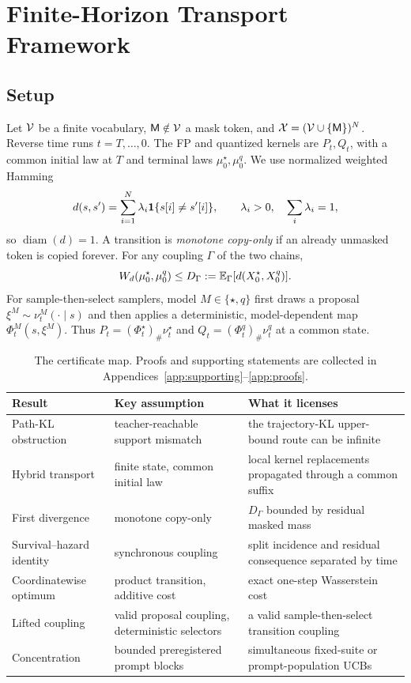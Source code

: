 \section{Finite-Horizon Transport Framework}
\label{sec:framework}

\subsection{Setup}
Let $\mathcal{V}$ be a finite vocabulary, $\mathsf{M}\notin\mathcal{V}$ a mask token, and $\mathcal{X}=(\mathcal{V}\cup\{\mathsf{M}\})^N$. Reverse time runs $t=T,\ldots,0$. The FP and quantized kernels are $P_t,Q_t$, with a common initial law at $T$ and terminal laws $\mu_0^\star,\mu_0^q$. We use normalized weighted Hamming
\begin{equation}
 d(s,s')=\sum_{i=1}^N\lambda_i\mathbf{1}\{s[i]\ne s'[i]\},
 \qquad \lambda_i>0,\quad \sum_i\lambda_i=1,
 \label{eq:metric}
\end{equation}
so $\operatorname{diam}(d)=1$. A transition is \emph{monotone copy-only} if an already unmasked token is copied forever. For any coupling $\Gamma$ of the two chains,
\[
  W_{d}(\mu_0^\star,\mu_0^q)
  \le D_\Gamma:=\mathbb{E}_\Gamma[d(X_0^\star,X_0^q)].
\]
For sample-then-select samplers, model $M\in\{\star,q\}$ first draws a proposal $\xi^M\sim\nu_t^M(\cdot\mid s)$ and then applies a deterministic, model-dependent map $\Phi_t^M(s,\xi^M)$. Thus $P_t=(\Phi_t^\star)_\#\nu_t^\star$ and $Q_t=(\Phi_t^q)_\#\nu_t^q$ at a common state.

\begin{table}[t]
\caption{The certificate map. Proofs and supporting statements are collected in Appendices~\ref{app:supporting}--\ref{app:proofs}.}
\label{tab:theory-map}
\centering\small
\begin{tabular}{@{}p{.22\linewidth}p{.28\linewidth}p{.41\linewidth}@{}}
\toprule
Result & Key assumption & What it licenses \\
\midrule
Path-KL obstruction & teacher-reachable support mismatch & the trajectory-KL upper-bound route can be infinite \\
Hybrid transport & finite state, common initial law & local kernel replacements propagated through a common suffix \\
First divergence & monotone copy-only & $D_\Gamma$ bounded by residual masked mass \\
Survival--hazard identity & synchronous coupling & split incidence and residual consequence separated by time \\
Coordinatewise optimum & product transition, additive cost & exact one-step Wasserstein cost \\
Lifted coupling & valid proposal coupling, deterministic selectors & a valid sample-then-select transition coupling \\
Concentration & bounded preregistered prompt blocks & simultaneous fixed-suite or prompt-population UCBs \\
\bottomrule
\end{tabular}
\end{table}

